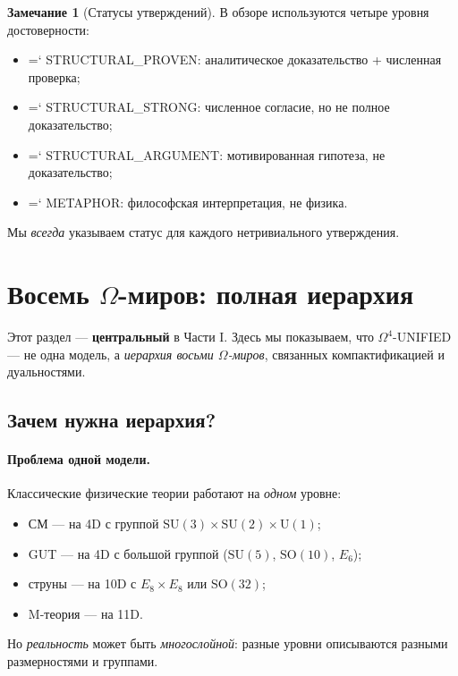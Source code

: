 \documentclass[11pt,a4paper]{article}
\newcommand{\SU}{\mathrm{SU}}
\newcommand{\SO}{\mathrm{SO}}
\newcommand{\Om}{\Omega^4}
\renewcommand{\texttt}[1]{{\ttfamily\hyphenchar\font=`\- #1}}
\theoremstyle{definition}
\newtheorem{remark}[theorem]{Замечание}
\begin{document}
\begin{remark}[Статусы утверждений]
\label{rem:statuses}
В обзоре используются четыре уровня достоверности:
\begin{itemize}
    \item \texttt{STRUCTURAL\_PROVEN}: аналитическое 
          доказательство + численная проверка;
    \item \texttt{STRUCTURAL\_STRONG}: численное согласие, 
          но не полное доказательство;
    \item \texttt{STRUCTURAL\_ARGUMENT}: мотивированная 
          гипотеза, не доказательство;
    \item \texttt{METAPHOR}: философская интерпретация, 
          не физика.
\end{itemize}
Мы \emph{всегда} указываем статус для каждого нетривиального 
утверждения.
\end{remark}

\section{Восемь \texorpdfstring{$\Omega$}{Omega}-миров: полная иерархия}
\label{sec:worlds}

Этот раздел — \textbf{центральный} в Части I. Здесь мы 
показываем, что $\Om$-UNIFIED — не одна модель, а 
\emph{иерархия восьми $\Omega$-миров}, связанных 
компактификацией и дуальностями.

\subsection{Зачем нужна иерархия?}
\label{subsec:why-hierarchy}

\paragraph{Проблема одной модели.}
Классические физические теории работают на \emph{одном} уровне:
\begin{itemize}
    \item СМ — на 4D с группой $\SU(3) \times \SU(2) \times \mathrm{U}(1)$;
    \item GUT — на 4D с большой группой ($\SU(5)$, $\SO(10)$, $E_6$);
    \item струны — на 10D с $E_8 \times E_8$ или $\SO(32)$;
    \item M-теория — на 11D.
\end{itemize}
Но \emph{реальность} может быть \emph{многослойной}: разные 
уровни описываются разными размерностями и группами.
\end{document}
